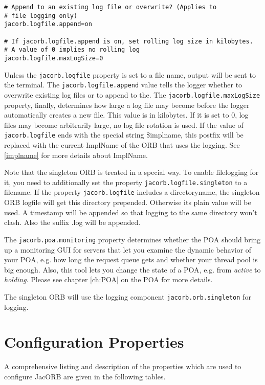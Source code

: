 {{{\begin{verbatim}
# Append to an existing log file or overwrite? (Applies to
# file logging only)
jacorb.logfile.append=on

# If jacorb.logfile.append is on, set rolling log size in kilobytes.
# A value of 0 implies no rolling log
jacorb.logfile.maxLogSize=0
\end{verbatim}
}
\renewcommand{\baselinestretch}{1.0}
\small\normalsize

Unless the {\tt jacorb.logfile} property is set to a file name, output
will be sent to the terminal. The {\tt jacorb.logfile.append} value
tells the logger whether to overwrite existing log files or to append
to the. The {\tt jacorb.logfile.maxLogSize} property, finally,
determines how large a log file may become before the logger
automatically creates a new file. This value is in kilobytes. If it is
set to 0, log files may become arbitrarily large, no log file rotation
is used. If the value of {\tt jacorb.logfile} ends with the special string \$implname,
this postfix will be replaced with the current ImplName of the ORB that
uses the logging. See \ref{implname} for more details about ImplName.

Note that the singleton ORB is treated in a special way. To enable filelogging for it,
you need to additionally set the property {\tt jacorb.logfile.singleton} to a filename.
If the property {\tt jacorb.logfile} includes a directoryname, the singleton ORB logfile
will get this directory prepended. Otherwise its plain value will be used. A timestamp will be
appended so that logging to the same directory won't clash. Also the suffix .log will be appended.

The  {\tt jacorb.poa.monitoring} property  determines whether  the POA
should bring up a monitoring GUI  for servers that let you examine the
dynamic behavior of  your POA, e.g.  how long  the request queue gets
and whether your thread pool is  big enough.  Also, this tool lets you
change the  state of a POA,  e.g. from {\it active}  to {\it holding}.
Please see chapter \ref{ch:POA} on the POA for more details.

The singleton ORB will use the logging component {\tt jacorb.orb.singleton} for
logging.

\section{Configuration Properties}

A comprehensive listing and description of the properties which are used
to configure JacORB are given in the following tables.

}}

